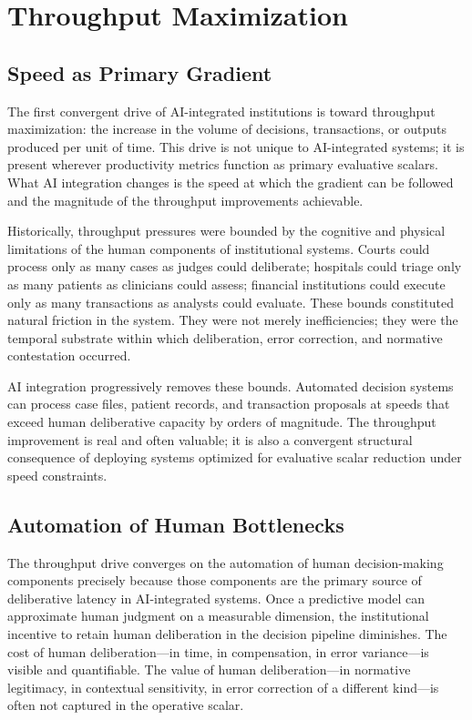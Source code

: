 \documentclass[12pt, oneside]{book}
\theoremstyle{plain}
\theoremstyle{definition}
\theoremstyle{remark}
\theoremstyle{definition}
\begin{document}
\chapter{Throughput Maximization}
\label{ch:throughput}

\section{Speed as Primary Gradient}

The first convergent drive of AI-integrated institutions is toward throughput
maximization: the increase in the volume of decisions, transactions, or outputs
produced per unit of time. This drive is not unique to AI-integrated systems; it
is present wherever productivity metrics function as primary evaluative scalars.
What AI integration changes is the speed at which the gradient can be followed and
the magnitude of the throughput improvements achievable.

Historically, throughput pressures were bounded by the cognitive and physical
limitations of the human components of institutional systems. Courts could process
only as many cases as judges could deliberate; hospitals could triage only as many
patients as clinicians could assess; financial institutions could execute only as
many transactions as analysts could evaluate. These bounds constituted natural
friction in the system. They were not merely inefficiencies; they were the temporal
substrate within which deliberation, error correction, and normative contestation
occurred.

AI integration progressively removes these bounds. Automated decision systems can
process case files, patient records, and transaction proposals at speeds that exceed
human deliberative capacity by orders of magnitude. The throughput improvement is
real and often valuable; it is also a convergent structural consequence of deploying
systems optimized for evaluative scalar reduction under speed constraints.

\section{Automation of Human Bottlenecks}

The throughput drive converges on the automation of human decision-making components
precisely because those components are the primary source of deliberative latency in
AI-integrated systems. Once a predictive model can approximate human judgment on a
measurable dimension, the institutional incentive to retain human deliberation in the
decision pipeline diminishes. The cost of human deliberation---in time, in
compensation, in error variance---is visible and quantifiable. The value of human
deliberation---in normative legitimacy, in contextual sensitivity, in error correction
of a different kind---is often not captured in the operative scalar.
\end{document}
